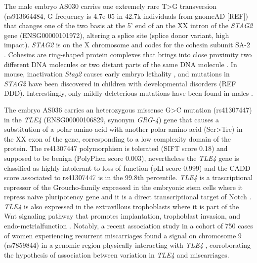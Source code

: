 \documentclass[fleqn,10pt]{wlscirep}
\begin{document}
The male embryo AS030 carries one extremely rare T>G transversion (rs913664484, G frequency is 4.7e-05 in 42.7k individuals from gnomeAD [REF]) that changes one of the two basis at the 5' end of an the XX intron of the \textit{STAG2} gene (ENSG00000101972), altering a splice site (splice donor variant, high impact). \textit{STAG2} is on the X chromosome and codes for the cohesin subunit SA-2 \cite{cuadrado2020specialized}. Cohesins are ring-shaped protein complexes that brings into close proximity two different DNA molecules or two distant parts of the same DNA molecule \cite{mcnicoll2013cohesin}. In mouse, inactivation \textit{Stag2} causes early embryo lethality \cite{de2020essential}, and  mutations in \textit{STAG2} have been discovered in children with developmental disorders (REF DDD). Interestingly, only mildly-deleterious mutations have been found in males \cite{mullegama2019mutations}. 

The embryo AS036 carries an heterozygous missense G>C mutation (rs41307447) in the \textit{TLE4} (ENSG00000106829, synonym \textit{GRG-4}) gene that causes a substitution of a polar amino acid with another polar amino acid (Ser>Tre) in the XX exon of the gene, corresponding to a low complexity domain of the protein. The rs41307447 polymorphism is tolerated (SIFT score 0.18) and supposed to be benign (PolyPhen score 0.003), nevertheless the \textit{TLE4} gene is classified as highly intolerant to loss of function (pLI score 0.999) and the CADD score associated to rs41307447 is in the 99.8th percentile. 
\textit{TLE4} is a trascriptional repressor of the Groucho-family expressed in the embryonic stem cells where it repress naive pluripotency gene \cite{laing2015gro} and it is a direct transcriptional target of Notch \cite{menchero2019transitions}. \textit{TLE4} is also expressed in the extravillous trophoblasts \cite{meinhardt2014wnt} where it is part of the Wnt signaling pathway that promotes implantation, trophoblast invasion, and endo-metrialfunction \cite{sonderegger2010wnt}. Notably, a recent association study in a cohort of 750 cases of women experiencing recurrent miscarriages found a signal on chromosome 9 (rs7859844) in a genomic region physically interacting with \textit{TLE4} \cite{laisk2019genetic}, corroborating the hypothesis of association between variation in \textit{TLE4} and miscarriages. 
\end{document}
